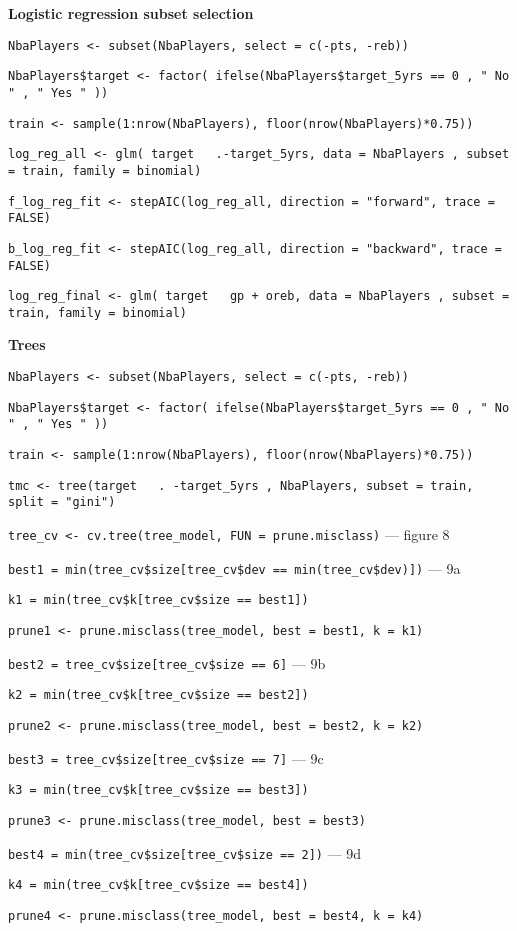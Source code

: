 \noindent
\textbf{Logistic regression subset selection}

\begin{center}
\texttt{NbaPlayers <- subset(NbaPlayers, select = c(-pts, -reb))}

\texttt{NbaPlayers\$target <- factor( ifelse(NbaPlayers\$target\_5yrs == 0 , " No " , " Yes " ))}

\texttt{train <- sample(1:nrow(NbaPlayers), floor(nrow(NbaPlayers)*0.75))}

\texttt{log\_reg\_all <- glm( target ~ .-target\_5yrs, data = NbaPlayers , subset = train, family = binomial)}

\texttt{f\_log\_reg\_fit <- stepAIC(log\_reg\_all, direction = "forward", trace = FALSE)}

\texttt{b\_log\_reg\_fit <- stepAIC(log\_reg\_all, direction = "backward", trace = FALSE)}

\texttt{log\_reg\_final <- glm( target ~ gp + oreb, data = NbaPlayers , subset = train, family = binomial)}
\end{center}
	
\noindent
\textbf{Trees}

\begin{center}
\texttt{NbaPlayers <- subset(NbaPlayers, select = c(-pts, -reb))}

\texttt{NbaPlayers\$target <- factor( ifelse(NbaPlayers\$target\_5yrs == 0 , " No " , " Yes " ))}

\texttt{train <- sample(1:nrow(NbaPlayers), floor(nrow(NbaPlayers)*0.75))}

\texttt{tmc <- tree(target ~ . -target\_5yrs , NbaPlayers, subset = train, split = "gini")}

\texttt{tree\_cv <- cv.tree(tree\_model, FUN = prune.misclass)} --- figure 8

\texttt{best1 = min(tree\_cv\$size[tree\_cv\$dev == min(tree\_cv\$dev)])} --- 9a

\texttt{k1 = min(tree\_cv\$k[tree\_cv\$size == best1])}

\texttt{prune1 <- prune.misclass(tree\_model, best = best1, k = k1)}

\texttt{best2 = tree\_cv\$size[tree\_cv\$size == 6]} --- 9b

\texttt{k2 = min(tree\_cv\$k[tree\_cv\$size == best2])}

\texttt{prune2 <- prune.misclass(tree\_model, best = best2, k = k2)}

\texttt{best3 = tree\_cv\$size[tree\_cv\$size == 7]} --- 9c

\texttt{k3 = min(tree\_cv\$k[tree\_cv\$size == best3])}

\texttt{prune3 <- prune.misclass(tree\_model, best = best3)}

\texttt{best4 = min(tree\_cv\$size[tree\_cv\$size == 2])} --- 9d

\texttt{k4 = min(tree\_cv\$k[tree\_cv\$size == best4])}

\texttt{prune4 <- prune.misclass(tree\_model, best = best4, k = k4)}
\end{center}

